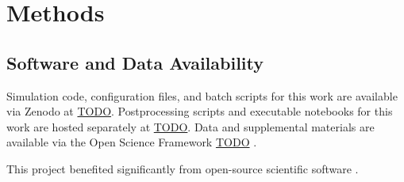 \section{Methods} \label{sec:methods}







\subsection{Software and Data Availability} \label{sec:materials}

Simulation code, configuration files, and batch scripts for this work are available via Zenodo at \url{TODO}.
Postprocessing scripts and executable notebooks for this work are hosted separately at \url{TODO}.
Data and supplemental materials are available via the Open Science Framework \url{TODO} \citep{foster2017open}.

This project benefited significantly from open-source scientific software \citep{2020SciPy-NMeth,harris2020array,reback2020pandas,mckinney-proc-scipy-2010,waskom2021seaborn,hunter2007matplotlib,moreno2023teeplot}.
